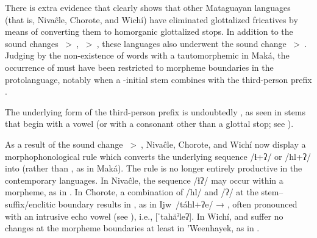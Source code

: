 There is extra evidence that clearly shows that other Mataguayan languages (that is, Nivaĉle, Chorote, and Wichí) have eliminated glottalized fricatives by means of converting them to homorganic glottalized stops. In addition to the sound changes ~>~, ~>~, these languages also underwent the sound change ~>~. Judging by the non-existence of words with a tautomorphemic  in Maká, the occurrence of  must have been restricted to morpheme boundaries in the protolanguage, notably when a \mbox{-}initial stem combines with the third-person prefix .

\begin{exe}
    \ex \fatalhaitssg
    \ex \cordits
    \ex \femalebreastits
    \ex \skinits
    \ex \meatits
    \ex \juiceits
    \ex \urineits
\end{exe}

The underlying form of the third-person prefix is undoubtedly , as seen in stems that begin with a vowel (or with a consonant other than a glottal stop; see ).

\begin{exe}
    \ex \mouthits
    \ex \flowerits
    \ex \wordametits
    \ex \stingerits   
    \ex \fooditssg
    \ex \sonits
    \ex \daughterits
    \ex \drinknitssg
    \ex \jarits
    \ex \wingitssg
    \ex \yicaayitssg
    \ex \thorneitssg
    \ex \namenitssg
    \ex \inhabitantits
    \ex \resinits
    \ex \penisits
    \ex \seedits
    \ex \nestits
\end{exe}

As a result of the sound change ~>~, Nivaĉle, Chorote, and Wichí now display a morphophonological rule which converts the underlying sequence /ɬ+ʔ/ or /hl+ʔ/ into  (rather than , as in Maká). The rule is no longer entirely productive in the contemporary languages. In Nivaĉle, the sequence /ɬʔ/ may occur within a morpheme, as in . In Chorote, a combination of /hl/ and /ʔ/ at the stem--suffix/enclitic boundary results in , as in Ijw~/táhl+ʔe/ → , often pronounced with an intrusive echo vowel (see ), i.e., [ˈtahăˀleʔ]. In Wichí,  and  suffer no changes at the morpheme boundaries at least in ’Weenhayek, as in .

